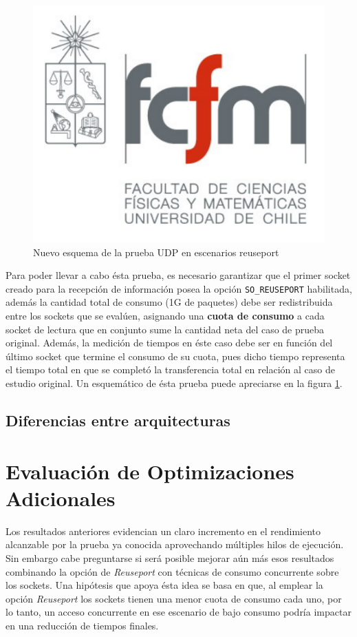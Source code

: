 \begin{figure}[!h]
	\centering
	\includegraphics[scale=.3]{imagenes/fcfm}
	\caption{Nuevo esquema de la prueba UDP en escenarios reuseport}
	\label{fig:casoPruebaReuseport}
\end{figure}

Para poder llevar a cabo ésta prueba, es necesario garantizar que el primer socket creado para la recepción de información posea la opción \verb=SO_REUSEPORT= habilitada, además la cantidad total de consumo (1G de paquetes) debe ser redistribuida entre los sockets que se evalúen, asignando una \textbf{cuota de consumo} a cada socket de lectura que en conjunto sume la cantidad neta del caso de prueba original. Además, la medición de tiempos en éste caso debe ser en función del último socket que termine el consumo de su cuota, pues dicho tiempo representa el tiempo total en que se completó la transferencia total en relación al caso de estudio original. Un esquemático de ésta prueba puede apreciarse en la figura \ref{fig:casoPruebaReuseport}.

\subsection{Diferencias entre arquitecturas}


\section{Evaluación de Optimizaciones Adicionales}
Los resultados anteriores evidencian un claro incremento en el rendimiento alcanzable por la prueba ya conocida aprovechando múltiples hilos de ejecución. Sin embargo cabe preguntarse si será posible mejorar aún más esos resultados combinando la opción de \emph{Reuseport} con técnicas de consumo concurrente sobre los sockets. Una hipótesis que apoya ésta idea se basa en que, al emplear la opción \emph{Reuseport} los sockets tienen una menor cuota de consumo cada uno, por lo tanto, un acceso concurrente en ese escenario de bajo consumo podría impactar en una reducción de tiempos finales.

